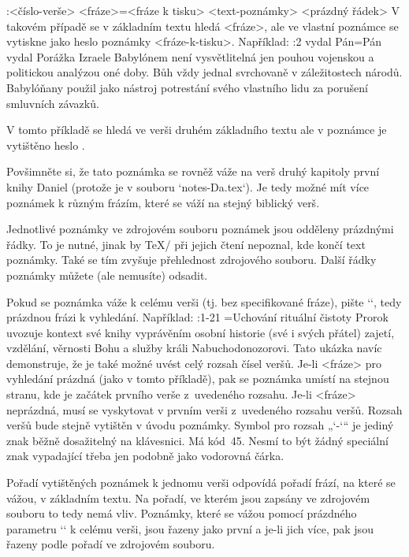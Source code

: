 \begtt
{}:<číslo-verše> {<fráze>}={<fráze k tisku>} <text-poznámky>
<prázdný řádek>
\endtt
V takovém případě se v základním textu hledá <fráze>, ale ve vlastní
poznámce se vytiskne jako heslo poznámky <fráze-k-tisku>. Například:
\begtt
{}:2 {vydal Pán}={Pán vydal} Porážka Izraele Babylónem není vysvětlitelná
   jen pouhou vojenskou a politickou analýzou oné doby. Bůh vždy jednal svrchovaně 
   v záležitostech národů. Babylóňany použil jako nástroj potrestání svého vlastního
   lidu za porušení smluvních závazků.

\endtt
V tomto příkladě se hledá ve verši druhém základního textu  
ale v poznámce je vytištěno heslo .

Povšimněte si, že tato poznámka se rovněž váže na verš druhý kapitoly první
knihy Daniel (protože je v souboru `notes-Da.tex`). Je tedy možné mít více
poznámek k různým frázím, které se váží na stejný biblický verš. 

Jednotlivé poznámky ve zdrojovém souboru poznámek jsou odděleny prázdnými
řádky. To je nutné, jinak by \TeX/ při jejich čtení nepoznal, kde končí text
poznámky. Také se tím zvyšuje přehlednost zdrojového souboru. Další řádky
poznámky můžete (ale nemusíte) odsadit. 


Pokud se poznámka váže k celému verši (tj. bez specifikované fráze), pište
`{}`, tedy prázdnou frázi k vyhledání. Například:
\begtt
{}:1-21 {}={Uchování rituální čistoty}  Prorok uvozuje kontext své knihy
   vyprávěním osobní historie (své i svých přátel) zajetí, vzdělání, věrnosti Bohu
   a služby králi Nabuchodonozorovi.
\endtt
Tato ukázka navíc demonstruje, že je také možné uvést celý rozsah čísel veršů.
Je-li <fráze> pro vyhledání prázdná (jako v tomto příkladě), pak se poznámka
umístí na stejnou stranu, kde je začátek prvního verše z~uvedeného rozsahu.
Je-li <fráze> neprázdná, musí se vyskytovat v prvním verši z~uvedeného
rozsahu veršů. Rozsah veršů bude stejně vytištěn v úvodu poznámky.
Symbol pro rozsah „`-`“ je jediný znak  běžně dosažitelný na
klávesnici. Má kód~45. Nesmí to být žádný speciální znak vypadající třeba jen podobně jako
vodorovná čárka.

Pořadí vytištěných poznámek k jednomu verši odpovídá pořadí frází, na které
se vážou, v základním textu. Na pořadí, ve kterém jsou zapsány ve zdrojovém
souboru to tedy nemá vliv. Poznámky, které se vážou pomocí prázdného parametru `{}` k celému
verši, jsou řazeny jako první a je-li jich více, pak jsou řazeny podle pořadí
ve zdrojovém souboru.


